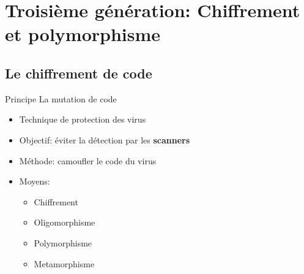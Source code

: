 \documentclass{beamer}
\begin{document}
\section{Troisième génération: Chiffrement et polymorphisme}

\subsection{Le chiffrement de code}

\begin{frame}{Principe}
La mutation de code
\begin{itemize}
\item Technique de protection des virus
\item Objectif: éviter la détection par les \textbf{scanners}
\item Méthode: camoufler le code du virus
\item Moyens:
\begin{itemize}
\item Chiffrement
\item Oligomorphisme
\item Polymorphisme
\item Metamorphisme
\end{itemize}
\end{itemize}
\end{frame}
\end{document}
